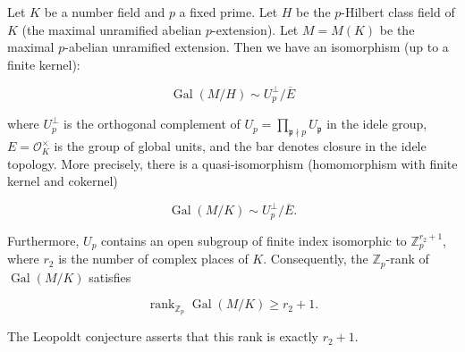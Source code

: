 Let $K$ be a number field and $p$ a fixed prime. Let $H$ be the $p$-Hilbert class field of $K$ (the maximal unramified abelian $p$-extension). Let $M = M(K)$ be the maximal $p$-abelian unramified extension. Then we have an isomorphism (up to a finite kernel):

$$
\operatorname{Gal}(M/H) \sim U_p^\perp / \overline{E}
$$

where $U_p^\perp$ is the orthogonal complement of $U_p = \prod_{\mathfrak{p} \nmid p} U_\mathfrak{p}$ in the idele group, $E = \mathcal{O}_K^\times$ is the group of global units, and the bar denotes closure in the idele topology. More precisely, there is a quasi-isomorphism (homomorphism with finite kernel and cokernel)

$$
\operatorname{Gal}(M/K) \sim U_p^\perp / \overline{E}.
$$

Furthermore, $U_p$ contains an open subgroup of finite index isomorphic to $\mathbb{Z}_p^{r_2+1}$, where $r_2$ is the number of complex places of $K$. Consequently, the $\mathbb{Z}_p$-rank of $\operatorname{Gal}(M/K)$ satisfies

$$
\operatorname{rank}_{\mathbb{Z}_p} \operatorname{Gal}(M/K) \geq r_2 + 1.
$$

The Leopoldt conjecture asserts that this rank is exactly $r_2 + 1$.
